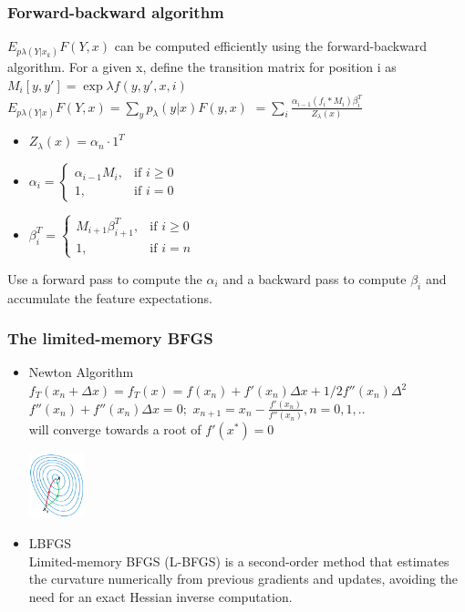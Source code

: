 \documentclass{beamer}
\begin{document}
\begin{frame}
  \frametitle{Forward-backward algorithm}
  $E_{p\lambda(Y|x_k)}F(Y,x)$ can be computed efficiently using the forward-backward algorithm.
For a given x, define the transition matrix for position i as
$M_i[y,y']=\exp \lambda f(y,y',x,i)$\\
$E_{p\lambda(Y|x)}F(Y,x)=\sum_y{p_\lambda(y|x)F(y,x)}$
$=\sum_i{\frac{\alpha_{i-1}(f_i*M_i)\beta_i^T}{Z_\lambda(x)}}$\\
\begin{itemize}
\item $Z_\lambda(x)=\alpha_n \cdot 1^T$
\item $\alpha_i = 
       \begin{cases} \alpha_{i-1}M_i, &\text{if } i\ge0\\
                     1, & \text{if } i=0
       \end{cases}$
\item $
       \beta_i^T = 
       \begin{cases} M_{i+1}\beta_{i+1}^T, &\text{if } i\ge0\\
                     1, & \text{if } i=n
       \end{cases}
      $
\end{itemize}
Use a forward pass to compute the $\alpha_i$ and a backward pass to compute $\beta_i$ and accumulate the feature expectations.
\end{frame}

\begin{frame}
  \frametitle{The limited-memory BFGS}
  \begin{itemize}

  \item Newton Algorithm\\ 
  $f_T(x_n+\Delta x)=f_T(x)=f(x_n)+f'(x_n)\Delta x +1/2f''(x_n)\Delta^2$\\
  $f''(x_n)+f''(x_n)\Delta x=0;$
  $x_{n+1} = x_n - \frac{f'(x_n)}{f''(x_n)},n=0,1,..$\\
  will converge towards a root of $f'(x^*)=0$
  \begin{center}
  \includegraphics[height=5em]{newton_grad.png}
  \end{center}
  \item LBFGS\\
 Limited-memory BFGS (L-BFGS) is a second-order
method that estimates the curvature numerically from
previous gradients and updates, avoiding the need for
an exact Hessian inverse computation.
  \end{itemize}
 
\end{frame}
\end{document}
